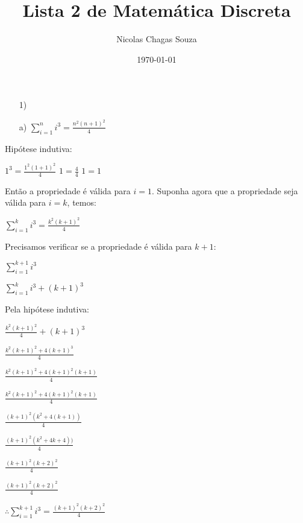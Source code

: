 \documentclass[13pt]{article}
\title{Lista 2 de Matemática Discreta}
\author{Nicolas Chagas Souza}
\date{\today}
\begin{document}
\maketitle



\begin{enumerate}

	\item[1)] 
   \end{enumerate}
   
    \begin{enumerate}
    \item[a)] $\sum\limits_{i=1}^{n} i^3 = \frac{n^2(n+1)^2}{4}  $
	\end{enumerate}
	Hipótese indutiva: 
	\begin{center}
	$1^3=\frac{1^2(1+1)^2}{4} $
	$1 = \frac{4}{4} $ 
	$1=1$
	\end{center}	
	Então a propriedade é válida para $i = 1$.	
	Suponha agora que a propriedade seja válida para $i = k$, temos:
	
	$\sum\limits_{i=1}^{k} i^3 = \frac{k^2(k+1)^2}{4}  $
	
	Precisamos verificar se a propriedade é válida para $k+1$:
	\begin{center}
	
	
	$\sum\limits_{i=1}^{k+1} i^3 $ 

	
	$\sum\limits_{i=1}^{k} i^3 + (k+1)^3$
	\end{center}
	Pela hipótese indutiva:
	\begin{center}
	$ \frac{k^2(k+1)^2}{4} + (k+1)^3 $ 
	
	$ \frac{k^2(k+1)^2+4(k+1)^3}{4}  $

	$ \frac{k^2(k+1)^2+4(k+1)^2(k+1)}{4} $ 
	
	$ \frac{k^2(k+1)^2+4(k+1)^2(k+1)}{4} $ 
	
	$ \frac{(k+1)^2 (k^2 + 4(k+1))}{4} $
	
	$ \frac{(k+1)^2 (k^2 + 4k +4))}{4} $
	
	$ \frac{(k+1)^2 (k+2)^2}{4} $
	
	$ \frac{(k+1)^2 (k+2)^2}{4} $
	
	$ \therefore \sum\limits_{i=1}^{k+1} i^3  = \frac{(k+1)^2 (k+2)^2}{4} $	
	
	\end{center}
	
	
	
	
	
	
	
	
\end{document}
